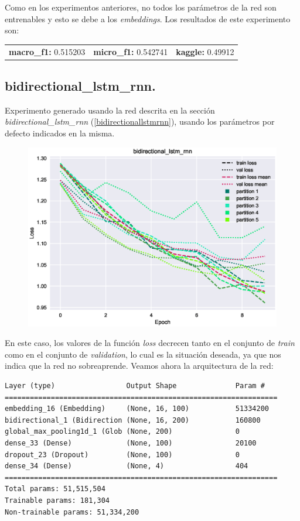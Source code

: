 \documentclass[11pt]{article}
\begin{document}
Como en los experimentos anteriores, no todos los parámetros de la red son entrenables y esto se debe a los \textit{embeddings}. Los resultados de este experimento son: 

\begin{table}[H]
\begin{tabular}{c|c|c}
\textbf{macro\_f1:} 0.515203 & \textbf{micro\_f1:} 0.542741 & \textbf{kaggle:} 0.49912
\end{tabular}
\end{table}

\subsection{bidirectional\_lstm\_rnn.} \label{exp_bidirectionallstmrnn}

Experimento generado usando la red descrita en la sección \textit{bidirectional\_lstm\_rnn} (\ref{bidirectionallstmrnn}), usando los parámetros por defecto indicados en la misma. 

\begin{figure}[H]
\includegraphics[width=\linewidth]{images/loss/bidirectional_lstm_rnn-1554328051.eps}
\end{figure}

En este caso, los valores de la función \textit{loss} decrecen tanto en el conjunto de \textit{train} como en el conjunto de \textit{validation}, lo cual es la situación deseada, ya que nos indica que la red no sobreaprende. Veamos ahora la arquitectura de la red:

\begin{verbatim}
Layer (type)                 Output Shape              Param #   
=================================================================
embedding_16 (Embedding)     (None, 16, 100)           51334200  
bidirectional_1 (Bidirection (None, 16, 200)           160800    
global_max_pooling1d_1 (Glob (None, 200)               0         
dense_33 (Dense)             (None, 100)               20100     
dropout_23 (Dropout)         (None, 100)               0         
dense_34 (Dense)             (None, 4)                 404       
=================================================================
Total params: 51,515,504
Trainable params: 181,304
Non-trainable params: 51,334,200
\end{verbatim}
\end{document}
